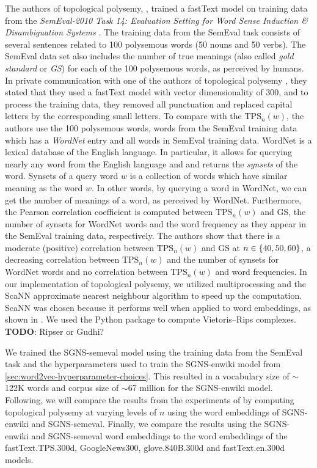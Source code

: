 The authors of topological polysemy, \cite{jakubowski2020topology}, trained a fastText model on training data from the \textit{SemEval-2010 Task 14: Evaluation Setting for Word Sense Induction \& Disambiguation Systems} \cite{manandhar-klapaftis-2009-semeval}. The training data from the SemEval task consists of several sentences related to 100 polysemous words (50 nouns and 50 verbs). The SemEval data set also includes the number of true meanings (also called \textit{gold standard} or \textit{GS}) for each of the 100 polysemous words, as perceived by humans. In private communication with one of the authors of topological polysemy \cite{ZibrowiusPrivComs2021}, they stated that they used a fastText model with vector dimensionality of 300, and to process the training data, they removed all punctuation and replaced capital letters by the corresponding small letters. To compare with the $\text{TPS}_n(w)$, the authors use the 100 polysemous words, words from the SemEval training data which has a \textit{WordNet} \cite{fellbaum1998} entry and all words in SemEval training data. WordNet is a lexical database of the English language. In particular, it allows for querying nearly any word from the English language and and returns the \textit{synsets} of the word. Synsets of a query word $w$ is a collection of words which have similar meaning as the word $w$. In other words, by querying a word in WordNet, we can get the number of meanings of a word, as perceived by WordNet. Furthermore, the Pearson correlation coefficient \cite{James2013} is computed between $\text{TPS}_n(w)$ and GS, the number of synsets for WordNet words and the word frequency as they appear in the SemEval training data, respectively. The authors show that there is a moderate (positive) correlation between $\text{TPS}_n(w)$ and GS at $n \in \left\{40, 50, 60\right\}$, a decreasing correlation between $\text{TPS}_n(w)$ and the number of synsets for WordNet words and no correlation between $\text{TPS}_n(w)$ and word frequencies. In our implementation of topological polysemy, we utilized multiprocessing and the ScaNN \cite{scann2020} approximate nearest neighbour algorithm to speed up the computation. ScaNN was chosen because it performs well when applied to word embeddings, as shown in \cite{AnnBenchmarks2021}. We used the  \cite{ctralie2018ripser} Python package to compute Vietoris–Rips complexes. \textbf{TODO}: Ripser or Gudhi?

We trained the SGNS-semeval model using the training data from the SemEval task and the hyperparameters used to train the SGNS-enwiki model from \cref{sec:word2vec-hyperparameter-choices}. This resulted in a vocabulary size of $\sim$122K words and corpus size of $\sim$67 million for the SGNS-enwiki model. Following, we will compare the results from the experiments of \cite{jakubowski2020topology} by computing topological polysemy at varying levels of $n$ using the word embeddings of SGNS-enwiki and SGNS-semeval. Finally, we compare the results using the SGNS-enwiki and SGNS-semeval word embeddings to the word embeddings of the fastText.TPS.300d, GoogleNews300, glove.840B.300d and fastText.en.300d models.

